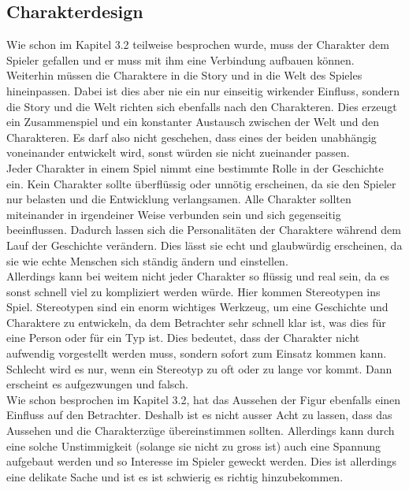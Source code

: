 \documentclass[12pt,a4paper,titlepage]{article}
\begin{document}
	\subsection{Charakterdesign}
		Wie schon im Kapitel 3.2 teilweise besprochen wurde, muss der Charakter dem Spieler gefallen und er muss mit ihm eine Verbindung aufbauen können. Weiterhin müssen die Charaktere in die Story und in die Welt des Spieles hineinpassen. Dabei ist dies aber nie ein nur einseitig wirkender Einfluss, sondern die Story und die Welt richten sich ebenfalls nach den Charakteren. Dies erzeugt ein Zusammenspiel und ein konstanter Austausch zwischen der Welt und den Charakteren. Es darf also nicht geschehen, dass eines der beiden unabhängig voneinander entwickelt wird, sonst würden sie nicht zueinander passen.\\
		
		Jeder Charakter in einem Spiel nimmt eine bestimmte Rolle in der Geschichte ein. Kein Charakter sollte überflüssig oder unnötig erscheinen, da sie den Spieler nur belasten und die Entwicklung verlangsamen. Alle Charakter sollten miteinander in irgendeiner Weise verbunden sein und sich gegenseitig beeinflussen. Dadurch lassen sich die Personalitäten der Charaktere während dem Lauf der Geschichte verändern. Dies lässt sie echt und glaubwürdig erscheinen, da sie wie echte Menschen sich ständig ändern und einstellen.\\
		
		Allerdings kann bei weitem nicht jeder Charakter so flüssig und real sein, da es sonst schnell viel zu kompliziert werden würde. Hier kommen Stereotypen ins Spiel. Stereotypen sind ein enorm wichtiges Werkzeug, um eine Geschichte und Charaktere zu entwickeln, da dem Betrachter sehr schnell klar ist, was dies für eine Person oder für ein Typ ist. Dies bedeutet, dass der Charakter nicht aufwendig vorgestellt werden muss, sondern sofort zum Einsatz kommen kann. Schlecht wird es nur, wenn ein Stereotyp zu oft oder zu lange vor kommt. Dann erscheint es aufgezwungen und falsch.\\
		
		Wie schon besprochen im Kapitel 3.2, hat das Aussehen der Figur ebenfalls einen Einfluss auf den Betrachter. Deshalb ist es nicht ausser Acht zu lassen, dass das Aussehen und die Charakterzüge übereinstimmen sollten. Allerdings kann durch eine solche Unstimmigkeit (solange sie nicht zu gross ist) auch eine Spannung aufgebaut werden und so Interesse im Spieler geweckt werden. Dies ist allerdings eine delikate Sache und ist es ist schwierig es richtig hinzubekommen.\\
		
\end{document}
